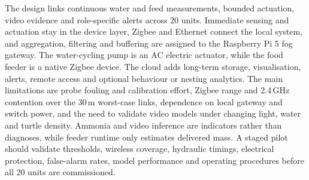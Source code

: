 \documentclass[lang=en,11pt,a4paper,citestyle=apa,bibstyle=apa]{elegantpaper}
\begin{document}
The design links continuous water and feed measurements, bounded actuation, video evidence and role-specific alerts across 20 units. Immediate sensing and actuation stay in the device layer, Zigbee and Ethernet connect the local system, and aggregation, filtering and buffering are assigned to the Raspberry Pi 5 fog gateway. The water-cycling pump is an AC electric actuator, while the food feeder is a native Zigbee device. The cloud adds long-term storage, visualisation, alerts, remote access and optional behaviour or nesting analytics. The main limitations are probe fouling and calibration effort, Zigbee range and 2.4\,GHz contention over the 30\,m worst-case links, dependence on local gateway and switch power, and the need to validate video models under changing light, water and turtle density. Ammonia and video inference are indicators rather than diagnoses, while feeder runtime only estimates delivered mass. A staged pilot should validate thresholds, wireless coverage, hydraulic timings, electrical protection, false-alarm rates, model performance and operating procedures before all 20 units are commissioned.

\printbibliography[title={References}]
\end{document}
